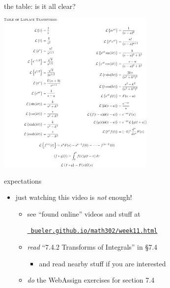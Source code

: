 \documentclass[urlcolor=blue,dvipsnames]{beamer}
\begin{document}
\begin{frame}{the table: is it all clear?}

\vspace{-3mm}
\begin{center}
\includegraphics[height=80mm]{figs/fulllaplacetable}
\end{center}
\end{frame}


\begin{frame}{expectations}

\begin{itemize}
\item just watching this video is \emph{not} enough!
     \begin{itemize}
     \item see ``found online'' videos and stuff at

     \centerline{\href{https://bueler.github.io/math302/week11.html}{\tt \color{cyan} bueler.github.io/math302/week11.html}}
     \item \emph{read} ``7.4.2 Transforms of Integrals'' in \S7.4
         \begin{itemize}
         \item and read nearby stuff if you are interested
         \end{itemize}
     \item \emph{do} the WebAssign exercises for section 7.4
     \end{itemize}
\end{itemize}
\end{frame}
\end{document}
